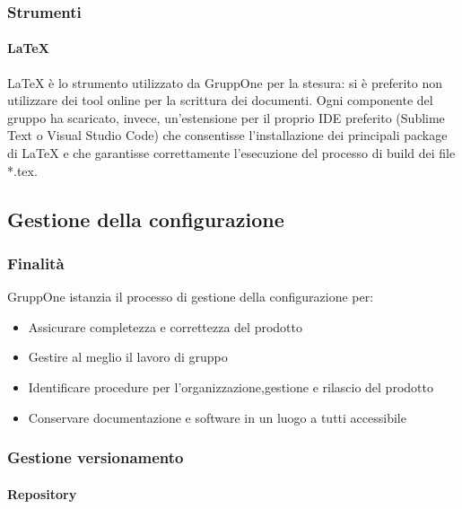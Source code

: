 \documentclass[../norme-di-progetto.tex]{subfiles}
\begin{document}
\subsubsection{Strumenti}

\paragraph{\LaTeX}%
\label{par:LaTeX}
\LaTeX{} è lo strumento utilizzato da GruppOne per la stesura: si è preferito non utilizzare dei tool online per la scrittura dei documenti.
Ogni componente del gruppo ha scaricato, invece, un'estensione per il proprio IDE preferito (Sublime Text o Visual Studio Code) che consentisse l'installazione dei principali package di \LaTeX{} e che garantisse correttamente l'esecuzione del processo di build dei file *.tex.

\subsection{Gestione della configurazione}%
\label{sub:gestione_della_configurazione}

\subsubsection{Finalità}%
\label{subs:gestione_della_configurazione/finalita}

GruppOne istanzia il processo di gestione della configurazione per:
\begin{itemize}
  \item Assicurare completezza e correttezza del prodotto
  \item Gestire al meglio il lavoro di gruppo
  \item Identificare procedure per l'organizzazione,gestione e rilascio del prodotto
  \item Conservare documentazione e software in un luogo a tutti accessibile
\end{itemize}

\subsubsection{Gestione versionamento}%
\label{subs:gestione_versionamento}

\paragraph{Repository}%
\label{par:repository}
\end{document}
